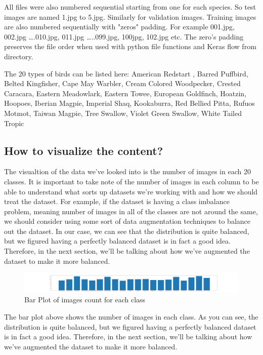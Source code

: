All files were also numbered sequential starting from one for each species. So test images are named 1.jpg to 5.jpg. Similarly for validation images. Training images are also numbered sequentially with "zeros" padding. For example 001.jpg, 002.jpg ….010.jpg, 011.jpg …..099.jpg, 100jpg, 102.jpg etc. The zero's padding preserves the file order when used with python file functions and Keras flow from directory.

The 20 types of birds can be listed here:
American Redstart ,
Barred Puffbird,
Belted Kingfisher,
Cape May Warbler,
Cream Colored Woodpecker,
Crested Caracara,
Eastern Meadowlark,
Eastern Towee,
European Goldfinch,
Hoatzin,
Hoopoes,
Iberian Magpie,
Imperial Shaq,
Kookaburra,
Red Bellied Pitta,
Rufuos Motmot,
Taiwan Magpie,
Tree Swallow,
Violet Green Swallow,
White Tailed Tropic

\subsection{How to visualize the content?}

The visualtion of the data we've looked into is the number of images in each 20 classes. It is important to take note of the number of images in each column to be able to understand what sorts up datasets we're working with and how we should treat the dataset. For example, if the dataset is having a class imbalance problem, meaning number of images in all of the classes are not around the same, we should consider using some sort of data augmentation techniques to balance out the dataset. In our case, we can see that the distribution is quite balanced, but we figured having a perfectly balanced dataset is in fact a good idea. Therefore, in the next section, we'll be talking about how we've augmented the dataset to make it more balanced.

\begin{figure}[h]
\centering
\includegraphics[scale=0.10]{diagrams/data_description.png}
\caption{Bar Plot of images count for each class}
\end{figure}
The bar plot above shows the number of images in each class. As you can see, the distribution is quite balanced, but we figured having a perfectly balanced dataset is in fact a good idea. Therefore, in the next section, we'll be talking about how we've augmented the dataset to make it more balanced.

